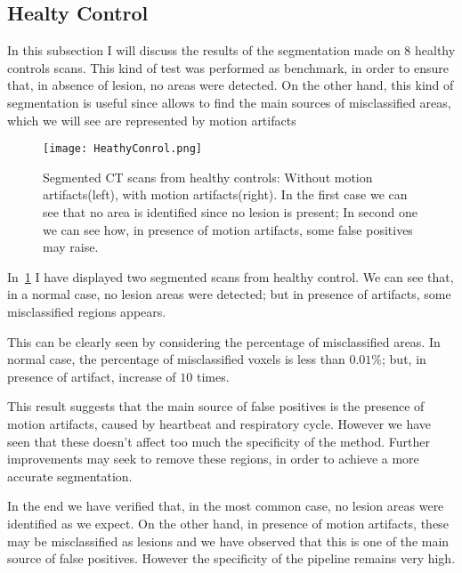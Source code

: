 
	\subsection{Healty Control}
	
	In this subsection I will discuss the results of the segmentation made on $8$ healthy controls scans. This kind of  test was performed as benchmark, in order to ensure that, in absence of lesion, no areas were detected. On the other hand, this kind of segmentation is useful since allows to find the main sources of misclassified areas, which we will see are represented by motion artifacts
	
	\begin{figure}[h!]
		\centering
			\texttt{[image: HeathyConrol.png]}
			\caption{Segmented CT scans from healthy controls: Without motion artifacts(left), with motion artifacts(right). In the first case we can see that no area is identified since no lesion is present; In second one we can see how, in presence of motion artifacts, some false positives may raise.  }\label{fig:HealthyControl}
	\end{figure}

	In \figurename\,\ref{fig:HealthyControl} I have displayed two segmented scans from healthy control. We can see that, in a normal case, no lesion areas were detected; but in presence of artifacts, some misclassified regions appears.
	
	This can be clearly seen by considering the percentage of misclassified areas. In normal case, the percentage of misclassified voxels is less than $0.01\%$; but, in presence of artifact, increase of $10$ times. 
	
	This result suggests that the main source of false positives is the presence of motion artifacts, caused by heartbeat and respiratory cycle. 
	However we have seen that these doesn't affect too much the specificity of the method. Further improvements may seek to remove these regions, in order to achieve a more accurate segmentation.
	
	In the end we have verified that, in the most common case, no lesion areas were identified as we expect. On the other hand, in presence of motion artifacts, these may be misclassified as lesions and we have observed that this is one of the main source of false positives. However the specificity of the pipeline remains very high. 
	
	
	

